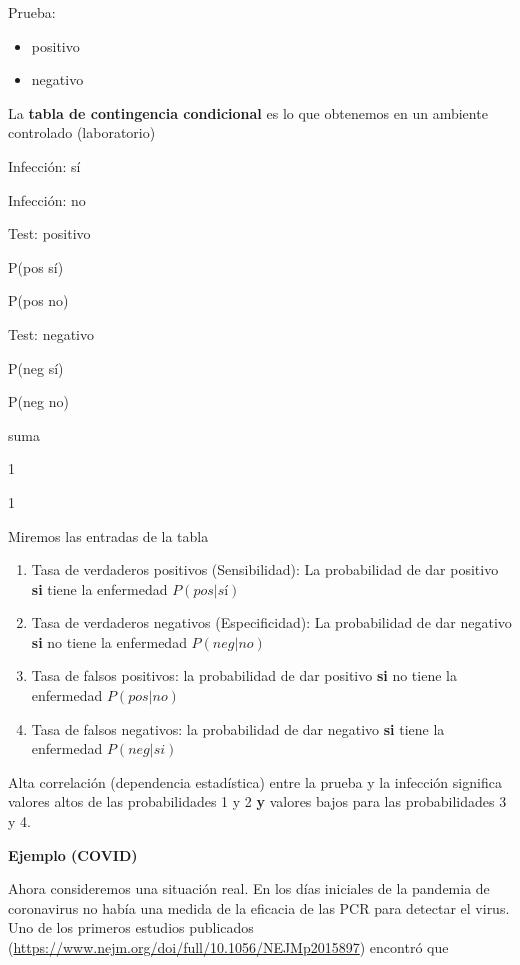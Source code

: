 \documentclass[
]{book}
\providecommand{\tightlist}{%
  \setlength{\itemsep}{0pt}\setlength{\parskip}{0pt}}
\begin{document}
Prueba:

\begin{itemize}
\tightlist
\item
  positivo
\item
  negativo
\end{itemize}

La \textbf{tabla de contingencia condicional} es lo que obtenemos en un ambiente controlado (laboratorio)

Infección: sí

Infección: no

Test: positivo

P(pos {\textbar{}} sí)

P(pos {\textbar{}} no)

Test: negativo

P(neg {\textbar{}} sí)

P(neg {\textbar{}} no)

suma

1

1

Miremos las entradas de la tabla

\begin{enumerate}
\def\labelenumi{\arabic{enumi})}
\item
  Tasa de verdaderos positivos (Sensibilidad): La probabilidad de dar positivo \textbf{si} tiene la enfermedad \(P(pos|sí)\)
\item
  Tasa de verdaderos negativos (Especificidad): La probabilidad de dar negativo \textbf{si} no tiene la enfermedad \(P(neg|no)\)
\item
  Tasa de falsos positivos: la probabilidad de dar positivo \textbf{si} no tiene la enfermedad \(P(pos|no)\)
\item
  Tasa de falsos negativos: la probabilidad de dar negativo \textbf{si} tiene la enfermedad \(P(neg|si)\)
\end{enumerate}

Alta correlación (dependencia estadística) entre la prueba y la infección significa valores altos de las probabilidades 1 y 2 \textbf{y} valores bajos para las probabilidades 3 y 4.

\textbf{Ejemplo (COVID)}

Ahora consideremos una situación real. En los días iniciales de la pandemia de coronavirus no había una medida de la eficacia de las PCR para detectar el virus. Uno de los primeros estudios publicados (\url{https://www.nejm.org/doi/full/10.1056/NEJMp2015897}) encontró que
\end{document}
